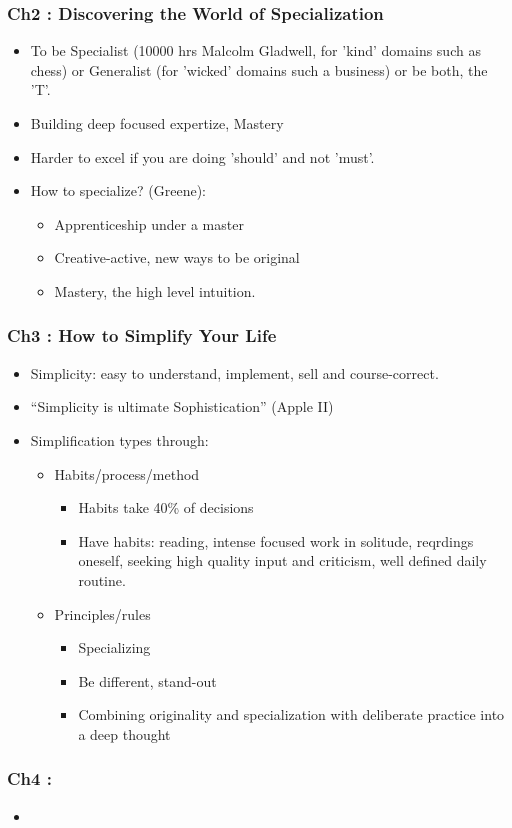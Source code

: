 \begin{frame}[fragile]\frametitle{Ch2 : Discovering the World of Specialization}

\begin{itemize}
\item To be Specialist (10000 hrs Malcolm Gladwell, for 'kind' domains such as chess) or Generalist (for 'wicked' domains such a business) or be both, the 'T'.
\item Building deep focused expertize, Mastery
\item Harder to excel if you are doing 'should' and not 'must'.
\item How to specialize? (Greene):
	\begin{itemize}
	\item Apprenticeship under a master
	\item Creative-active, new ways to be original
	\item Mastery, the high level intuition.
	\end{itemize}
\end{itemize}

\end{frame}

\begin{frame}[fragile]\frametitle{Ch3 : How to Simplify Your Life}

\begin{itemize}
\item Simplicity: easy to understand, implement, sell and course-correct.
\item ``Simplicity is ultimate Sophistication'' (Apple II)
\item Simplification types through:
	\begin{itemize}
	\item Habits/process/method
		\begin{itemize}
		\item Habits take 40\% of decisions
		\item Have habits: reading, intense focused work in solitude, reqrdings oneself, seeking high quality input and criticism, well defined daily routine.		
		\end{itemize}	
	\item Principles/rules
		\begin{itemize}
		\item Specializing
		\item Be different, stand-out
		\item Combining originality and specialization with deliberate practice into a deep thought
		\end{itemize}		
	\end{itemize}
\end{itemize}

\end{frame}

\begin{frame}[fragile]\frametitle{Ch4 : }

\begin{itemize}
\item 
\end{itemize}

\end{frame}




